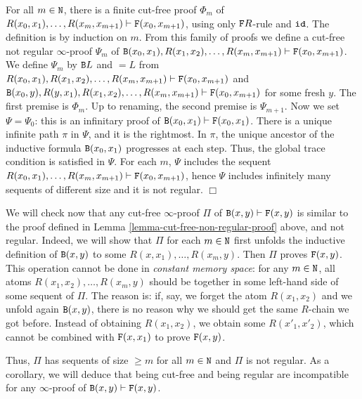 \documentclass[a4paper,12pt]{article}
\newenvironment{proof}[1][Proof]{\begin{trivlist}
\item[\hskip \labelsep {\bfseries #1}]}{\end{trivlist}}
\newcommand{\Nat}               { {\tt N}  }
\newcommand{\Backward}         { {\tt B} }
\newcommand{\Forward}         { {\tt F} }
\newcommand{\id}              { {\tt id} }
\newcommand{\eqL}     {= \! \!  \!  L}
\begin{document}
\begin{proof}
For all $m \in \Nat$, there  is a finite cut-free proof $\Phi_m$ of $R(x_0,x_1), \ldots, R(x_{m},x_{m+1}) \vdash \Forward(x_0,x_{m+1})$, using only $\Forward R$-rule and $\id$. The definition is by induction on $m$. From this family of proofs we define a cut-free not regular $\infty$-proof $\Psi_m$ of $\Backward(x_0,x_1),  R(x_1,x_2), \ldots, R(x_{m},x_{m+1}) \vdash \Forward(x_0,x_{m+1})$. We define $\Psi_m$ by $\Backward L$ and $\eqL $ from $R(x_0,x_1),  R(x_1,x_2), \ldots, R(x_{m},x_{m+1}) \vdash \Forward(x_0,x_{m+1})$ and $\Backward(x_0,y),  R(y,x_1), R(x_1,x_2), \ldots, R(x_{m},x_{m+1}) \vdash \Forward(x_0,x_{m+1})$ for some fresh $y$. The first premise is $\Phi_m$. Up to renaming, the second premise is $\Psi_{m+1}$. Now we set $\Psi = \Psi_0$: this is an infinitary proof of $\Backward(x_0,x_1)\vdash \Forward(x_0,x_{1})$. There is a unique infinite path $\pi$ in $\Psi$, and it is the rightmost. In $\pi$, the unique ancestor of the inductive formula $\Backward(x_0,x_1)$ progresses at each step. Thus, the global trace condition is satisfied in $\Psi$. For each $m$, $\Psi$ includes the sequent $R(x_0,x_1), \ldots, R(x_{m},x_{m+1}) \vdash \Forward(x_0,x_{m+1})$, hence $\Psi$ includes infinitely many sequents of different  size and it is not regular.
$\Box$ \end{proof}

We will check now that any cut-free $\infty$-proof $\Pi$ of $\Backward(x,y) \vdash \Forward(x,y)$ is similar to the proof defined in Lemma \ref{lemma-cut-free-non-regular-proof} above, and not regular. Indeed, we will show that $\Pi$ for each $m \in \Nat$ first unfolds the inductive definition of $\Backward(x,y)$ to some $R(x,x_1), \ldots, R(x_m,y)$. Then $\Pi$ proves $\Forward(x,y)$. This operation cannot be done in \emph{constant memory space}: for any $m \in \Nat$, all atoms $R(x_1,x_2), \ldots, R(x_m,y)$ should be together in some left-hand side of some sequent of $\Pi$. The reason is: if, say, we forget the atom $R(x_1,x_2)$ and we unfold again $\Backward(x,y)$, there is no reason why we should get the same $R$-chain we got before. Instead of obtaining $R(x_1,x_2)$, we obtain some $R(x'_1,x'_2)$, which cannot be combined with  $\Forward(x,x_1)$ to prove $\Forward(x,y)$.

Thus, $\Pi$ has sequents of size $\ge m$ for all $m \in \Nat$ and $\Pi$ is not regular. As a corollary, we will deduce that being cut-free and being regular are incompatible for any $\infty$-proof of $\Backward(x,y) \vdash \Forward(x,y)$. 
\\
\end{document}
